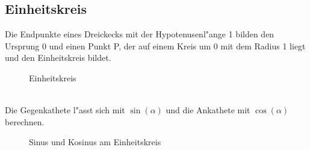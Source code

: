 \documentclass{standalone}
\begin{document}
\subsection{Einheitskreis}
\noindent Die Endpunkte eines Dreickecks mit der Hypotenusenl{"a}nge 1 bilden den Ursprung 0 und einen Punkt P, der auf einem Kreis um 0 mit dem Radius 1 liegt und den Einheitskreis bildet.
\vspace{-0.3cm}  %
\begin{figure}[hb!]
  \center
  \def\svgwidth{150px}
  
  \caption{Einheitskreis}
  \label{fig:0_alpha_90_360}
\end{figure}
\\\noindent Die Gegenkathete l{"a}sst sich mit $\sin(\alpha)$ und die Ankathete mit $\cos(\alpha)$ berechnen. 
\vspace{-0.3cm}  %
\begin{figure}[hb!]
	\centering
	\def\svgwidth{150px}
	
	\caption{Sinus und Kosinus am Einheitskreis}
	\label{fig:sin_cos_einheitskreis}
\end{figure}
\end{document}
